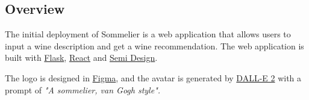 \documentclass[
	a4paper,
	fontsize=10pt, %
	twoside=false, %
	secnumdepth=2, %
]{kaohandt}
\begin{document}
\subsection{Overview}

The initial deployment of Sommelier is a web application that allows users to input a wine description and get a wine recommendation. The web application is built with \href{https://flask.palletsprojects.com/}{Flask}, \href{https://reactjs.org/}{React} and \href{https://semi.design/en-US}{Semi Design}.

The logo is designed in \href{https://www.figma.com/}{Figma}, and the avatar is generated by \href{https://openai.com/dall-e-2/}{DALL-E 2} with a prompt of \textit{"A sommelier, van Gogh style".}
\end{document}
